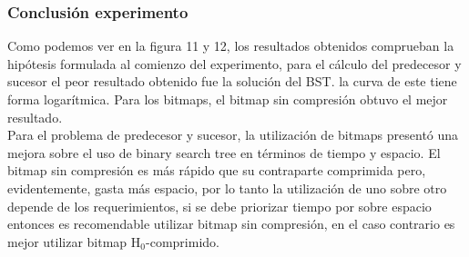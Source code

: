 \documentclass[11pt]{article}
\begin{document}
\subsubsection{Conclusión experimento}
Como podemos ver en la figura 11 y 12, los resultados obtenidos comprueban la hipótesis formulada al comienzo del experimento, para el cálculo del predecesor y sucesor el peor resultado obtenido fue la solución del BST. la curva de este tiene forma logarítmica. Para los bitmaps, el bitmap sin compresión obtuvo el mejor resultado.\\

Para el problema de predecesor y sucesor, la utilización de bitmaps presentó una mejora sobre el uso de binary search tree en términos de tiempo y espacio. El bitmap sin compresión es más rápido que su contraparte comprimida pero, evidentemente, gasta más espacio, por lo tanto la utilización de uno sobre otro depende de los requerimientos, si se debe priorizar tiempo por sobre espacio entonces es recomendable utilizar bitmap sin compresión, en el caso contrario es mejor utilizar bitmap H$_{0}$-comprimido.
\end{document}
